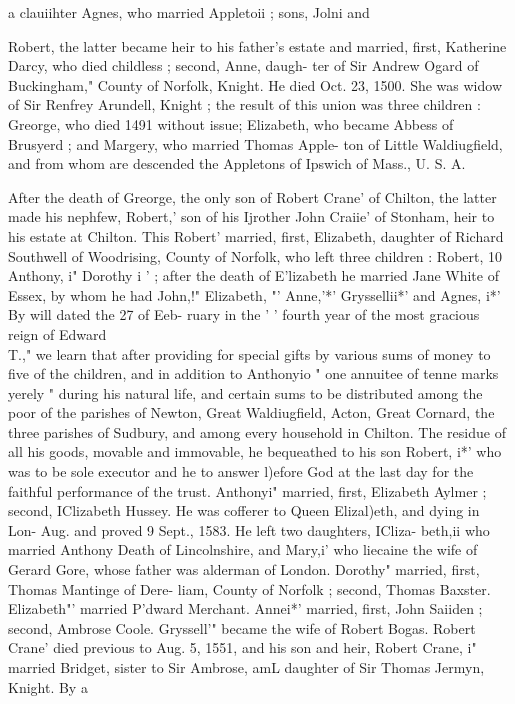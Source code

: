 \documentclass{book}
\begin{document}
a clauiihter Agnes, who married Appletoii ; sons, Jolni and 

Robert, the latter became heir to his father's estate and married, 
first, Katherine Darcy, who died childless ; second, Anne, daugh- 
ter of Sir Andrew Ogard of Buckingham," County of Norfolk, 
Knight. He died Oct. 23, 1500. She was widow of Sir Renfrey 
Arundell, Knight ; the result of this union was three children : 
Greorge, who died 1491 without issue; Elizabeth, who became 
Abbess of Brusyerd ; and Margery, who married Thomas Apple- 
ton of Little Waldiugfield, and from whom are descended the 
Appletons of Ipswich of Mass., U. S. A. 

After the death of Greorge, the only son of Robert Crane' of 
Chilton, the latter made his nephfew, Robert,' son of his Ijrother 
John Craiie' of Stonham, heir to his estate at Chilton. This 
Robert' married, first, Elizabeth, daughter of Richard Southwell 
of Woodrising, County of Norfolk, who left three children : 
Robert, 10 Anthony, i" Dorothy i ' ; after the death of E'lizabeth he 
married Jane White of Essex, by whom he had John,!" Elizabeth, "' 
Anne,'*' Gryssellii*' and Agnes, i*' By will dated the 27 of Eeb- 
ruary in the ' ' fourth year of the most gracious reign of Edward 
\\T.," we learn that after providing for special gifts by various 
sums of money to five of the children, and in addition to Anthonyio 
" one annuitee of tenne marks yerely " during his natural life, and 
certain sums to be distributed among the poor of the parishes of 
Newton, Great Waldiugfield, Acton, Great Cornard, the three 
parishes of Sudbury, and among every household in Chilton. The 
residue of all his goods, movable and immovable, he bequeathed 
to his son Robert, i*' who was to be sole executor and he to answer 
l)efore God at the last day for the faithful performance of the trust. 
Anthonyi" married, first, Elizabeth Aylmer ; second, IClizabeth 
Hussey. He was cofferer to Queen Elizal)eth, and dying in Lon- 
Aug. and proved 9 Sept., 1583. He left two daughters, ICliza- 
beth,ii who married Anthony Death of Lincolnshire, and Mary,i' 
who liecaine the wife of Gerard Gore, whose father was alderman 
of London. Dorothy" married, first, Thomas Mantinge of Dere- 
liam, County of Norfolk ; second, Thomas Baxster. Elizabeth"' 
married P'dward Merchant. Annei*' married, first, John Saiiden ; 
second, Ambrose Coole. Gryssell'" became the wife of Robert 
Bogas. Robert Crane' died previous to Aug. 5, 1551, and his 
son and heir, Robert Crane, i" married Bridget, sister to Sir 
Ambrose, amL daughter of Sir Thomas Jermyn, Knight. By a 
\end{document}

